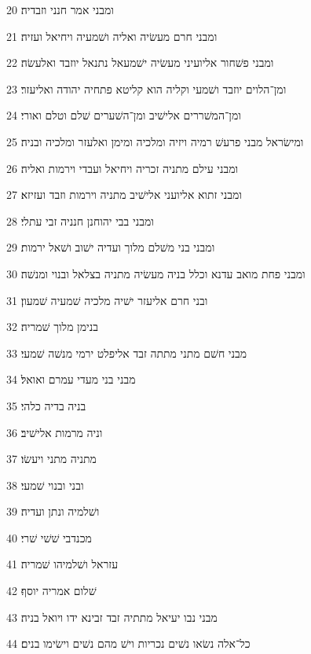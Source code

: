 \par 20 ומבני אמר חנני וזבדיה׃
\par 21 ומבני חרם מעשׂיה ואליה ושׁמעיה ויחיאל ועזיה׃
\par 22 ומבני פשׁחור אליועיני מעשׂיה ישׁמעאל נתנאל יוזבד ואלעשׂה׃
\par 23 ומן־הלוים יוזבד ושׁמעי וקליה הוא קליטא פתחיה יהודה ואליעזר׃
\par 24 ומן־המשׁררים אלישׁיב ומן־השׁערים שׁלם וטלם ואורי׃
\par 25 ומישׂראל מבני פרעשׁ רמיה ויזיה ומלכיה ומימן ואלעזר ומלכיה ובניה׃
\par 26 ומבני עילם מתניה זכריה ויחיאל ועבדי וירמות ואליה׃
\par 27 ומבני זתוא אליועני אלישׁיב מתניה וירמות וזבד ועזיזא׃
\par 28 ומבני בבי יהוחנן חנניה זבי עתלי׃
\par 29 ומבני בני משׁלם מלוך ועדיה ישׁוב ושׁאל ירמות׃
\par 30 ומבני פחת מואב עדנא וכלל בניה מעשׂיה מתניה בצלאל ובנוי ומנשׁה׃
\par 31 ובני חרם אליעזר ישׁיה מלכיה שׁמעיה שׁמעון׃
\par 32 בנימן מלוך שׁמריה׃
\par 33 מבני חשׁם מתני מתתה זבד אליפלט ירמי מנשׁה שׁמעי׃
\par 34 מבני בני מעדי עמרם ואואל׃
\par 35 בניה בדיה כלהי׃
\par 36 וניה מרמות אלישׁיב׃
\par 37 מתניה מתני ויעשׂו׃
\par 38 ובני ובנוי שׁמעי׃
\par 39 ושׁלמיה ונתן ועדיה׃
\par 40 מכנדבי שׁשׁי שׁרי׃
\par 41 עזראל ושׁלמיהו שׁמריה׃
\par 42 שׁלום אמריה יוסף׃
\par 43 מבני נבו יעיאל מתתיה זבד זבינא ידו ויואל בניה׃
\par 44 כל־אלה נשׂאו נשׁים נכריות וישׁ מהם נשׁים וישׂימו בנים׃


